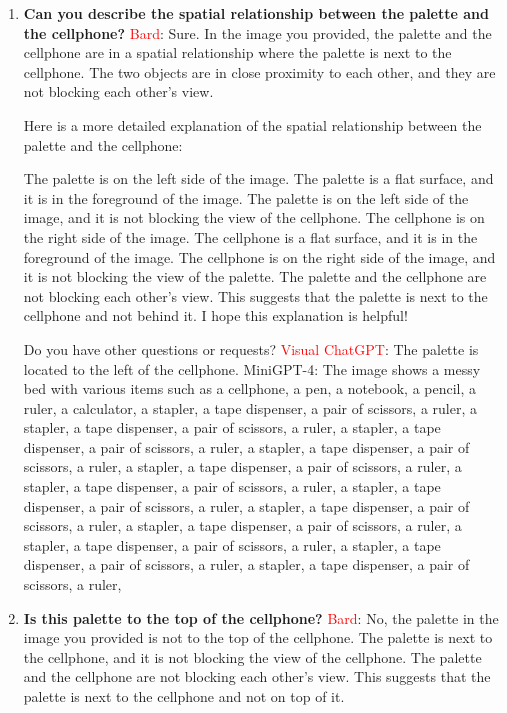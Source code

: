 \begin{enumerate}
    \item \textbf{Can you describe the spatial relationship between the palette and the cellphone?}
    \subitem \textcolor{Red}{Bard}: 
    Sure. In the image you provided, the palette and the cellphone are in a spatial relationship where the palette is next to the cellphone. The two objects are in close proximity to each other, and they are not blocking each other's view.
    
    Here is a more detailed explanation of the spatial relationship between the palette and the cellphone:
    
    The palette is on the left side of the image. The palette is a flat surface, and it is in the foreground of the image. The palette is on the left side of the image, and it is not blocking the view of the cellphone.
    The cellphone is on the right side of the image. The cellphone is a flat surface, and it is in the foreground of the image. The cellphone is on the right side of the image, and it is not blocking the view of the palette.
    The palette and the cellphone are not blocking each other's view. This suggests that the palette is next to the cellphone and not behind it.
    I hope this explanation is helpful!
    
    Do you have other questions or requests?
    \subitem \textcolor{red}{Visual ChatGPT}: The palette is located to the left of the cellphone.
    \subitem MiniGPT-4: The image shows a messy bed with various items such as a cellphone, a pen, a notebook, a pencil, a ruler, a calculator, a stapler, a tape dispenser, a pair of scissors, a ruler, a stapler, a tape dispenser, a pair of scissors, a ruler, a stapler, a tape dispenser, a pair of scissors, a ruler, a stapler, a tape dispenser, a pair of scissors, a ruler, a stapler, a tape dispenser, a pair of scissors, a ruler, a stapler, a tape dispenser, a pair of scissors, a ruler, a stapler, a tape dispenser, a pair of scissors, a ruler, a stapler, a tape dispenser, a pair of scissors, a ruler, a stapler, a tape dispenser, a pair of scissors, a ruler, a stapler, a tape dispenser, a pair of scissors, a ruler, a stapler, a tape dispenser, a pair of scissors, a ruler, a stapler, a tape dispenser, a pair of scissors, a ruler,
    \item \textbf{Is this palette to the top of the cellphone?}
    \subitem \textcolor{Red}{Bard}: No, the palette in the image you provided is not to the top of the cellphone. The palette is next to the cellphone, and it is not blocking the view of the cellphone. The palette and the cellphone are not blocking each other's view. This suggests that the palette is next to the cellphone and not on top of it.


\end{enumerate}
